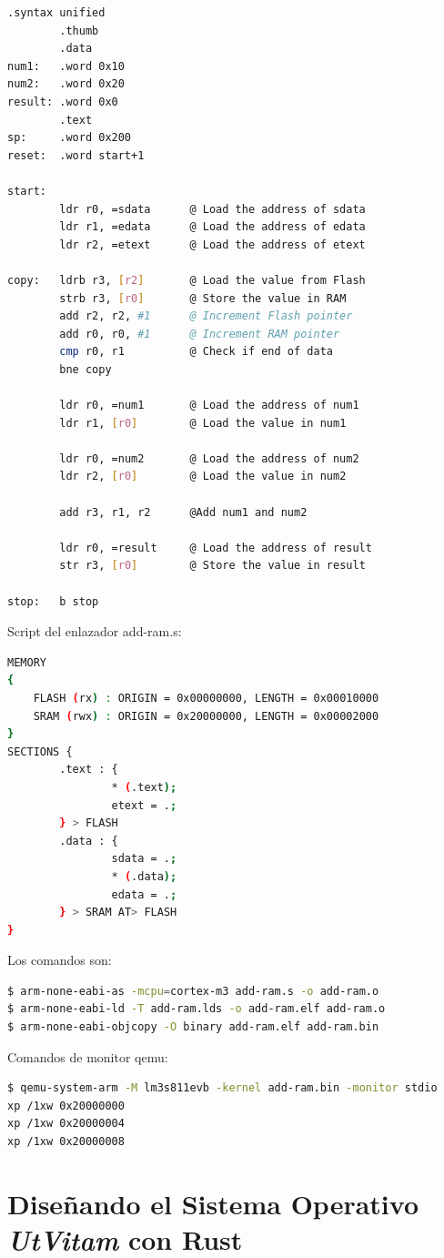 \documentclass[12pt, twoside]{report}
\begin{document}
\begin{lstlisting}[language=bash]
		.syntax unified
		.thumb
		.data
num1:	.word 0x10
num2:	.word 0x20
result: .word 0x0
		.text
sp:		.word 0x200
reset:	.word start+1

start:
		ldr r0, =sdata		@ Load the address of sdata
		ldr r1, =edata		@ Load the address of edata
		ldr r2, =etext		@ Load the address of etext

copy: 	ldrb r3, [r2]		@ Load the value from Flash
		strb r3, [r0]		@ Store the value in RAM
		add r2, r2, #1		@ Increment Flash pointer 
		add r0, r0, #1      @ Increment RAM pointer
		cmp r0, r1			@ Check if end of data
		bne	copy
		
		ldr r0, =num1		@ Load the address of num1
		ldr r1, [r0]		@ Load the value in num1
		
		ldr r0, =num2		@ Load the address of num2
		ldr r2, [r0]		@ Load the value in num2
		
		add r3, r1, r2 		@Add num1 and num2
		
		ldr r0, =result		@ Load the address of result
		str r3, [r0]		@ Store the value in result
		
stop:	b stop
\end{lstlisting}

Script del enlazador add-ram.s:

\begin{lstlisting}[language=bash]
MEMORY
{
	FLASH (rx) : ORIGIN = 0x00000000, LENGTH = 0x00010000
	SRAM (rwx) : ORIGIN = 0x20000000, LENGTH = 0x00002000
}
SECTIONS {
		.text : {
				* (.text);
				etext = .;
		} > FLASH
		.data : {
				sdata = .;
				* (.data);
				edata = .;
		} > SRAM AT> FLASH
}
\end{lstlisting}

Los comandos son:

\begin{lstlisting}[language=bash]
$ arm-none-eabi-as -mcpu=cortex-m3 add-ram.s -o add-ram.o
$ arm-none-eabi-ld -T add-ram.lds -o add-ram.elf add-ram.o
$ arm-none-eabi-objcopy -O binary add-ram.elf add-ram.bin
\end{lstlisting}

Comandos de monitor qemu:
\begin{lstlisting}[language=bash]
$ qemu-system-arm -M lm3s811evb -kernel add-ram.bin -monitor stdio
xp /1xw 0x20000000
xp /1xw 0x20000004
xp /1xw 0x20000008
\end{lstlisting}

\chapter{Diseñando el Sistema Operativo \textbf{\textit{UtVitam}} con Rust}
\end{document}
